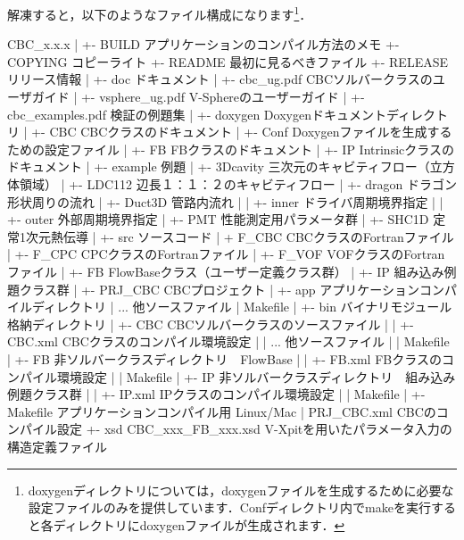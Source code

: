 解凍すると，以下のようなファイル構成になります\footnote{doxygenディレクトリについては，doxygenファイルを生成するために必要な設定ファイルのみを提供しています．Confディレクトリ内でmakeを実行すると各ディレクトリにdoxygenファイルが生成されます．}．

{ \small
\begin{program}
CBC_x.x.x
  |
  +- BUILD                        アプリケーションのコンパイル方法のメモ
  +- COPYING                      コピーライト
  +- README                       最初に見るべきファイル
  +- RELEASE                      リリース情報
  |
  +- doc                          ドキュメント
  |   +- cbc_ug.pdf               CBCソルバークラスのユーザガイド
  |   +- vsphere_ug.pdf           V-Sphereのユーザーガイド
  |   +- cbc_examples.pdf         検証の例題集
  |
  +- doxygen                      Doxygenドキュメントディレクトリ
  |   +- CBC                      CBCクラスのドキュメント
  |   +- Conf                     Doxygenファイルを生成するための設定ファイル
  |   +- FB                       FBクラスのドキュメント
  |   +- IP                       Intrinsicクラスのドキュメント
  |
  +- example                      例題
  |   +- 3Dcavity                 三次元のキャビティフロー（立方体領域）
  |   +- LDC112                   辺長１：１：２のキャビティフロー
  |   +- dragon                   ドラゴン形状周りの流れ
  |   +- Duct3D                   管路内流れ
  |   |   +- inner                ドライバ周期境界指定
  |   |   +- outer                外部周期境界指定
  |   +- PMT                      性能測定用パラメータ群
  |   +- SHC1D                    定常1次元熱伝導
  |
  +- src                          ソースコード
  |   +  F_CBC                    CBCクラスのFortranファイル
  |   +- F_CPC                    CPCクラスのFortranファイル
  |   +- F_VOF                    VOFクラスのFortranファイル
  |   +- FB                       FlowBaseクラス（ユーザー定義クラス群）
  |   +- IP                       組み込み例題クラス群
  |   +- PRJ_CBC	                 CBCプロジェクト
  |      +- app                  アプリケーションコンパイルディレクトリ
  |         ...                  他ソースファイル
  |         Makefile
  |      +- bin                  バイナリモジュール格納ディレクトリ
  |      +- CBC                  CBCソルバークラスのソースファイル
  |      |   +- CBC.xml          CBCクラスのコンパイル環境設定
  |      |      ...              他ソースファイル
  |      |      Makefile
  |      +- FB                   非ソルバークラスディレクトリ　FlowBase
  |      |   +- FB.xml           FBクラスのコンパイル環境設定  
  |      |      Makefile
  |      +- IP                   非ソルバークラスディレクトリ　組み込み例題クラス群
  |      |   +- IP.xml           IPクラスのコンパイル環境設定 
  |      |      Makefile
  |      +- Makefile             アプリケーションコンパイル用 Linux/Mac
  |         PRJ_CBC.xml          CBCのコンパイル設定
  +- xsd
     CBC_xxx_FB_xxx.xsd          V-Xpitを用いたパラメータ入力の構造定義ファイル
\end{program}
}

